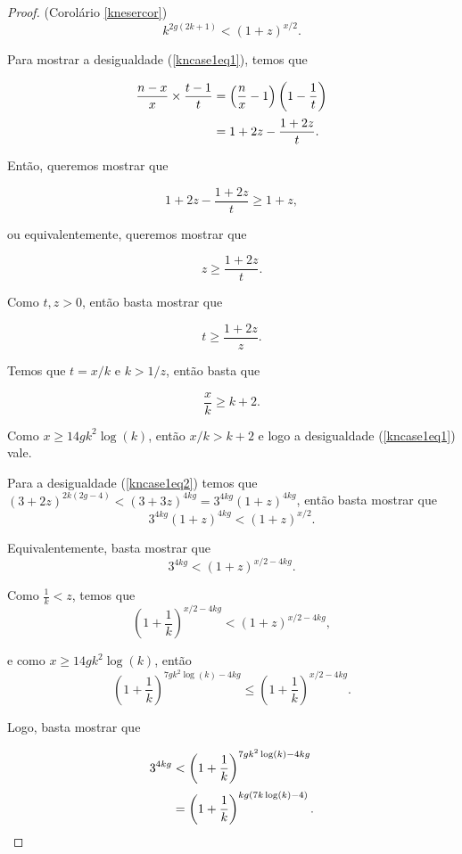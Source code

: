 \begin{proof}{(Corolário \ref{knesercor})}
\begin{equation}\label{kncase1eq3}
k^{2g(2k+1)} < (1+z)^{x/2}.
\end{equation}

Para mostrar a desigualdade (\ref{kncase1eq1}), temos que

\begin{equation*}
\setlength{\jot}{5pt}
\begin{aligned}
\frac{n-x}{x}\times \frac{t-1}{t} &= \left(\frac{n}{x} - 1\right)\left(1 - \frac{1}{t}\right)\\
&= 1 + 2z - \frac{1+2z}{t}.
\end{aligned}
\end{equation*}

Então, queremos mostrar que

\[1 + 2z - \frac{1+2z}{t} \geq 1 + z,\]

ou equivalentemente, queremos mostrar que

\[z \geq \frac{1+2z}{t}.\]

Como $t,z > 0$, então basta mostrar que 

\[t \geq \frac{1+2z}{z}.\]

Temos que $t = x/k$ e $k > 1/z$, então basta que

\[\frac{x}{k} \geq k + 2.\]

Como $x \geq 14gk^2\log(k)$, então $x/k > k+2$ e logo a desigualdade (\ref{kncase1eq1}) vale.\vspace{1em}


Para a desigualdade (\ref{kncase1eq2}) temos que $(3+2z)^{2k(2g-4)} < (3+3z)^{4kg} = 3^{4kg}(1+z)^{4kg}$, então basta mostrar que \[3^{4kg}(1+z)^{4kg} < (1+z)^{x/2}.\]

Equivalentemente, basta mostrar que  \[3^{4kg} < (1+z)^{x/2 - 4kg}.\]

Como $\frac{1}{k} < z$, temos que \[\left(1+\frac{1}{k}\right)^{x/2-4kg} < (1+z)^{x/2 - 4kg},\]

e como $x\geq 14gk^2\log(k)$, então \[\left(1+\frac{1}{k}\right)^{7gk^2\log(k) - 4kg} \leq \left(1+\frac{1}{k}\right)^{x/2-4kg}.\]

Logo, basta mostrar que

\begin{equation*}
\setlength{\jot}{5pt}
\begin{aligned}
3^{4kg} &<\left(1+\frac{1}{k}\right)^{7gk^2\log(k) - 4kg}\\
&= \left(1+\frac{1}{k}\right)^{kg(7k\log(k)-4)}.
\end{aligned}
\end{equation*}


\end{proof}

